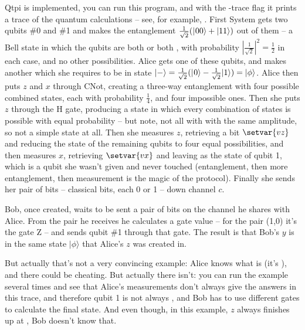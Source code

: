 \documentclass[11pt,a4paper]{article}
\begin{document}
Qtpi is implemented, you can run this program, and with the -trace flag it prints a trace of the quantum calculations -- see, for example, . First System gets two qubits \#0 and \#1 and makes the entanglement $\frac{1}{\sqrt{2}}(|\hspace{0.5pt}00\rangle+|11\rangle)$ out of them -- a Bell state in which the qubits are both \zero{} or both \one{}, with probability $|\frac{1}{\sqrt{2}}|^{2} = \frac{1}{2}$ in each case, and no other possibilities. Alice gets one of these qubits, and makes another which she requires to be in state $\minus = \frac{1}{\sqrt{2}}(\zero-\frac{1}{\sqrt{2}}\one) = \bv{\phi}$. Alice then puts $z$ and $x$ through CNot, creating a three-way entanglement with four possible combined states, each with probability $\frac{1}{4}$, and four impossible ones. Then she puts $z$ through the H gate, producing a state in which every combination of states is possible with equal probability -- but note, not all with with the same amplitude, so not a simple state at all. Then she measures $z$, retrieving a bit $\setvar{vz}$ and reducing the state of the remaining qubits to four equal possibilities, and then measures $x$, retrieving $\setvar{vx}$ and leaving \plus as the state of qubit 1, which is a qubit she wasn't given and never touched (entanglement, then more entanglement, then measurement is the magic of the protocol). Finally she sends her pair of bits -- classical bits, each 0 or 1 -- down channel $c$.

Bob, once created, waits to be sent a pair of bits on the channel he shares with Alice. From the pair he receives he calculates a gate value -- for the pair (1,0) it's the gate Z -- and sends qubit \#1 through that gate. The result is that Bob's $y$ is in the same state $|\phi\rangle$ that Alice's $z$ was created in. 

But actually that's not a very convincing example: Alice knows what \bv{\phi} is (it's \minus), and there could be cheating. But actually there isn't: you can run the example several times and see that Alice's measurements don't always give the answers in this trace, and therefore qubit 1 is not always \plus, and Bob has to use different gates to calculate the final state. And even though, in this example, $z$ always finishes up at \minus, Bob doesn't know that.
\end{document}
